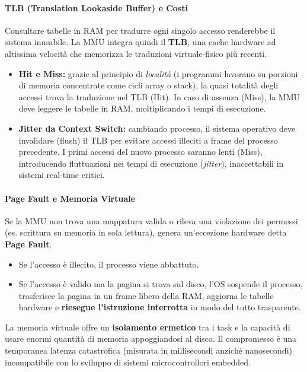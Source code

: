 \paragraph*{TLB (Translation Lookaside Buffer) e Costi}
Consultare tabelle in RAM per tradurre ogni singolo accesso renderebbe il sistema inusabile. La MMU integra quindi il \textbf{TLB}, una cache hardware ad altissima velocità che memorizza le traduzioni virtuale-fisico più recenti.
\begin{itemize}
    \item \textbf{Hit e Miss:} grazie al principio di \emph{località} (i programmi lavorano su porzioni di memoria concentrate come cicli array o stack), la quasi totalità degli accessi trova la traduzione nel TLB (Hit). In caso di assenza (Miss), la MMU deve leggere le tabelle in RAM, moltiplicando i tempi di esecuzione.
    \item \textbf{Jitter da Context Switch:} cambiando processo, il sistema operativo deve invalidare (flush) il TLB per evitare accessi illeciti a frame del processo precedente. I primi accessi del nuovo processo saranno lenti (Miss), introducendo fluttuazioni nei tempi di esecuzione (\emph{jitter}), inaccettabili in sistemi real-time critici.
\end{itemize}

\paragraph*{Page Fault e Memoria Virtuale}
Se la MMU non trova una mappatura valida o rileva una violazione dei permessi (es. scrittura su memoria in sola lettura), genera un'eccezione hardware detta \textbf{Page Fault}.
\begin{itemize}
    \item Se l'accesso è illecito, il processo viene abbattuto.
    \item Se l'accesso è valido ma la pagina si trova sul disco, l'OS sospende il processo, trasferisce la pagina in un frame libero della RAM, aggiorna le tabelle hardware e \textbf{riesegue l'istruzione interrotta} in modo del tutto trasparente.
\end{itemize}
La memoria virtuale offre un \textbf{isolamento ermetico} tra i task e la capacità di usare enormi quantità di memoria appoggiandosi al disco. Il compromesso è una temporanea latenza catastrofica (misurata in millisecondi anziché nanosecondi) incompatibile con lo sviluppo di sistemi microcontrollori embedded.

